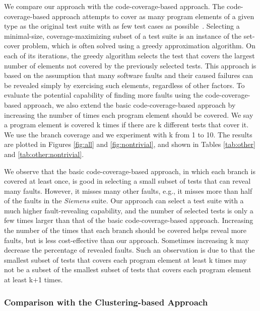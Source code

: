 \documentclass{sig-alternate}
\begin{document}
We compare our approach with the code-coverage-based approach. The
code-coverage-based approach attempts to cover as many program
elements of a given type as the original test suite with as few test
cases as possible~\cite{Leon05}. Selecting a minimal-size,
coverage-maximizing subset of a test suite is an instance of the
set-cover problem, which is often solved using a greedy
approximation algorithm. On each of its iterations, the greedy
algorithm selects the test that covers the largest number of
elements not covered by the previously selected tests. This approach
is based on the assumption that many software faults and their
caused failures can be revealed simply by exercising such elements,
regardless of other factors. To evaluate the potential capability of
finding more faults using the code-coverage-based approach, we also
extend the basic code-coverage-based approach by increasing the
number of times each program element should be covered. We say a
program element is covered k times if there are k different tests
that cover it. We use the branch coverage and we experiment with k
from 1 to 10. The results are plotted in Figures \ref{fig:all} and
\ref{fig:nontrivial}, and shown in Tables \ref{tab:other} and
\ref{tab:other:nontrivial}.

We observe that the basic code-coverage-based approach, in which
each branch is covered at least once, is good in selecting a small
subset of tests that can reveal many faults. However, it misses many
other faults, e.g., it misses more than half of the faults in the
\emph{Siemens} suite. Our approach can select a test suite with a
much higher fault-revealing capability, and the number of selected
tests is only a few times larger than that of the basic
code-coverage-based approach. Increasing the number of the times
that each branch should be covered helps reveal more faults, but is
less cost-effective than our approach. Sometimes increasing k may
decrease the percentage of revealed faults. Such an observation is
due to that the smallest subset of tests that covers each program
element at least k times may not be a subset of the smallest subset
of tests that covers each program element at least k+1 times.



\subsubsection{Comparison with the Clustering-based Approach}
\end{document}
